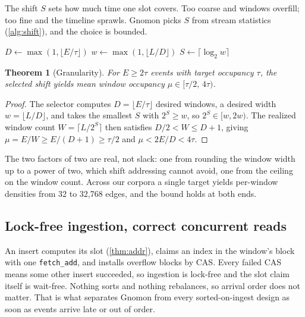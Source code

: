 \documentclass[letterpaper,twocolumn,10pt]{article}
\newtheorem{theorem}{Theorem}
\newcommand{\sys}{Gnomon\xspace}
\begin{document}
The shift $S$ sets how much time one slot covers. Too coarse and
windows overfill; too fine and the timeline sprawls. \sys picks $S$
from stream statistics (\cref{alg:shift}), and the choice is bounded.

\begin{algorithm}[t]
\small
\DontPrintSemicolon
{}
$D \leftarrow \max(1, \lfloor E/\tau \rfloor)$ 
$w \leftarrow \max(1, \lfloor L/D \rfloor)$ 
$S \leftarrow \lceil \log_2 w \rceil$ 
\caption{Adaptive granularity selection. Runs once on a stream
prefix; re-running on a later prefix changes only future windows,
since \cref{eq:mapping} is evaluated per edge at insert time.}
\label{alg:shift}
\end{algorithm}

\begin{theorem}[Granularity]
\label{thm:shift}
For $E \ge 2\tau$ events with target occupancy $\tau$, the selected
shift yields mean window occupancy $\mu \in [\tau/2,\, 4\tau)$.
\end{theorem}
\begin{proof}
The selector computes $D=\lfloor E/\tau \rfloor$ desired windows, a
desired width $w=\lfloor L/D \rfloor$, and takes the smallest $S$ with
$2^S \ge w$, so $2^S \in [w, 2w)$. The realized window count
$W=\lceil L/2^S \rceil$ then satisfies $D/2 < W \le D+1$, giving
$\mu = E/W \ge E/(D+1) \ge \tau/2$ and $\mu < 2E/D < 4\tau$.
\end{proof}

The two factors of two are real, not slack: one from rounding the
window width up to a power of two, which shift addressing cannot avoid,
one from the ceiling on the window count. Across our corpora a single
target yields per-window densities from 32 to 32{,}768 edges, and the
bound holds at both ends.

\subsection{Lock-free ingestion, correct concurrent reads}
\label{sec:design-ingest}
An insert computes its slot (\cref{thm:addr}), claims an index in the
window's block with one \texttt{fetch\_add}, and installs overflow
blocks by CAS. Every failed CAS means some other insert succeeded, so
ingestion is lock-free and the slot claim itself is wait-free. Nothing
sorts and nothing rebalances, so arrival order does not matter. That is
what separates \sys from every sorted-on-ingest design as soon as
events arrive late or out of order.
\end{document}
